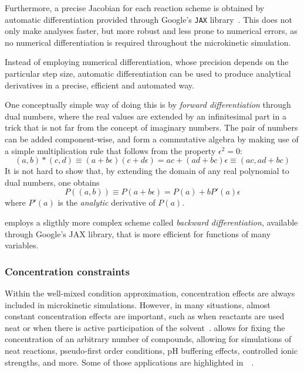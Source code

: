 Furthermore,
a precise Jacobian for each reaction scheme is obtained by automatic differentiation provided through Google's \texttt{JAX} library~\cite{jax2018github}.
This does not only make analyses faster,
but more robust and less prone to numerical errors,
as no numerical differentiation is required throughout the microkinetic simulation.

Instead of employing numerical differentiation,
whose precision depends on the
particular step size,
automatic differentiation can be used to produce
analytical derivatives in a precise,
efficient and automated way.

One conceptually simple way of doing this is by \emph{forward differentiation}
through dual numbers,
where the real values are extended by an infinitesimal
part in a trick that is not far from the concept of imaginary numbers.
The pair of numbers can be added component-wise,
and form a commutative algebra
by making use of a simple multiplication rule that follows from the property
$\epsilon^2 = 0$:
\begin{equation}
	(a,
	b) * (c,
	d)
	\equiv (a + b\epsilon)(c + d\epsilon)
	= a c + (a d + b c)\epsilon
	\equiv (a c,
	a d + b c)
\end{equation}
It is not hard to show that,
by extending the domain of any real polynomial to
dual numbers,
one obtains
\begin{equation}
	P((a,
	b)) \equiv P(a + b\epsilon) = P(a) + b P'(a) \epsilon
\end{equation}
where $P'(a)$ is the \emph{analytic} derivative of $P(a)$.

\overreact{} employs a sligthly more complex scheme called
\emph{backward differentiation},
available through Google's JAX library,
that
is more efficient for functions of many variables.

\subsubsection{Concentration constraints}%
\label{sec:microkinetic-constraints}

Within the well-mixed condition approximation,
concentration effects are always included in microkinetic simulations.
However,
in many situations,
almost constant concentration effects are important,
such as when reactants are used neat or when there is active participation of the solvent~\cite{Ryu_2018}.
\overreact{} allows for fixing the concentration of an arbitrary number of compounds,
allowing for simulations of neat reactions,
pseudo-first order conditions,
pH buffering effects,
controlled ionic strengths,
and more.
Some of those applications are highlighted in~\citeauthor{Schneider_2022}~\cite{Schneider_2022}.

